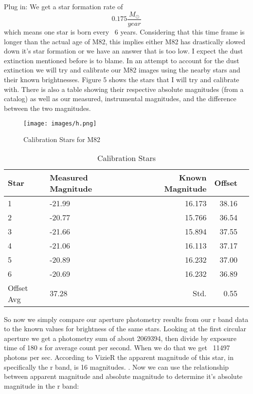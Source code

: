 \documentclass[modern]{aastex63}
\begin{document}
Plug in: We get a star formation rate of \begin{equation} 0.175 \frac{M_{\odot}}{year} \end{equation} which means one star is born every ~6 years. Considering that this time frame is longer than the actual age of M82, this implies either M82 has drastically slowed down it's star formation or we have an answer that is too low. I expect the dust extinction mentioned before is to blame. In an attempt to account for the dust extinction we will try and calibrate our M82 images using the nearby stars and their known brightnesses. Figure 5 shows the stars that I will try and calibrate with. There is also a table showing their respective absolute magnitudes (from a catalog) as well as our measured, instrumental magnitudes, and the difference between the two magnitudes.

\begin{figure}
\centering
\texttt{[image: images/h.png]}
\caption{\label{fig:frog}Calibration Stars for M82}
\end{figure}

\begin{table}
\caption{Calibration Stars}
\begin{tabular}{llrrl}
\toprule

Star & Measured Magnitude & Known Magnitude & Offset \\
\midrule
 1 &   -21.99 &  16.173 & 38.16\\
 2 &   -20.77 &  15.766 & 36.54\\
 3 &   -21.66 &  15.894 & 37.55\\
 4 &   -21.06 &  16.113 & 37.17\\
 5 &   -20.89 &  16.232 & 37.00\\
 6 &   -20.69 &  16.232 & 36.89\\
 \bottomrule
 Offset Avg & 37.28 & Std. & 0.55\\
\end{tabular}
\end{table}

So now we simply compare our aperture photometry results from our r band data to the known values for brightness of the same stars. Looking at the first circular aperture we get a photometry sum of about 2069394, then divide by exposure time of 180 s for average count per second. When we do that we get ~11497 photons per sec. According to VizieR the apparent magnitude of this star, in specifically the r band, is 16 magnitudes. \citep{2016yCat.5147....0A}. Now we can use the relationship between apparent magnitude and absolute magnitude to determine it's absolute magnitude in the r band:
\end{document}
